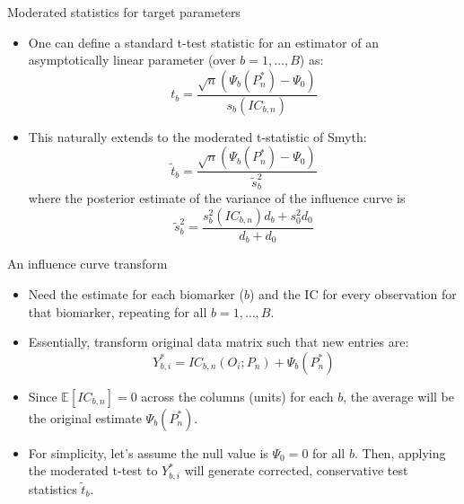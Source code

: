 \documentclass[12pt,t,handout]{beamer}
\begin{document}
\begin{frame}[c]{Moderated statistics for target parameters}

\begin{center}
\begin{itemize}
  \itemsep12pt
  \item One can define a standard t-test statistic for an estimator of an
    asymptotically linear parameter (over $b = 1, \dots, B$) as:
    \[
      t_b = \frac{\sqrt{n}(\Psi_b(P_n^*) - \Psi_0)}{s_b(IC_{b,n})}
    \]
  \item This naturally extends to the moderated t-statistic of Smyth:
    \[
      \tilde{t}_b = \frac{\sqrt{n}(\Psi_b(P_n^*) - \Psi_0)}{\tilde{s}_b^2}
    \]
    where the posterior estimate of the variance of the influence curve is
    \[
      \tilde{s}^2_b = \frac{s^2_b(IC_{b,n})d_b + s^2_0d_0}{d_b + d_0}
    \]
\end{itemize}
\end{center}

\end{frame}



\begin{frame}[c]{An influence curve transform}

\begin{center}
\begin{itemize}
  \itemsep12pt
  \item Need the estimate for each biomarker ($b$) and the IC for every
    observation for that biomarker, repeating for all $b = 1, \dots, B$.
  \item Essentially, transform original data matrix such that new entries are:
    \[
      Y^*_{b,i} = IC_{b,n}(O_i; P_n) + \Psi_b(P_n^*)
     \]
 \item Since $\mathbb{E}[IC_{b,n}] = 0$ across the columns (units) for each $b$,
   the average will be the original estimate $\Psi_b(P_n^*)$.
  \item For simplicity, let's assume the null value is $\Psi_0 = 0$ for all $b$.
    Then, applying the moderated t-test to $Y^*_{b,i}$ will generate corrected,
    conservative test statistics $\tilde{t}_b$.
\end{itemize}
\end{center}

\end{frame}
\end{document}
